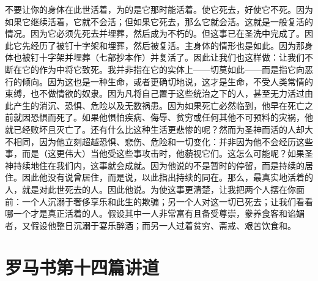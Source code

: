 不要让你的身体在此世活着，为的是它那时能活着。使它死去，好使它不死。因为如果它继续活着，它就不会活；但如果它死去，那么它就会活。这就是一般复活的情况。因为它必须先死去并埋葬，然后成为不朽的。但这事已在圣洗中完成了。因此它先经历了被钉十字架和埋葬，然后被复活。主身体的情形也是如此。因为那身体也被钉十字架并埋葬（七部抄本作）并复活了。因此让我们也这样做：让我们不断在它的作为中将它致死。我并非指在它的实体上——切莫如此——而是指它向恶行的倾向。因为这也是一种生命，或者更确切地说，这才是生命，不受人类常情的束缚，也不做情欲的奴隶。因为凡将自己置于这些统治之下的人，甚至无力活过由此产生的消沉、恐惧、危险以及无数祸患。因为如果死亡必然临到，他早在死亡之前就因恐惧而死了。如果他惧怕疾病、侮辱、贫穷或任何其他不可预料的灾祸，他就已经败坏且灭亡了。还有什么比这种生活更悲惨的呢？然而为圣神而活的人却大不相同，因为他立刻超越恐惧、悲伤、危险和一切变化：并非因为他不会经历这些事，而是（这更伟大）当他受这些事攻击时，他藐视它们。这怎么可能呢？如果圣神持续地住在我们内，这事就会成就。因为他说的不是暂时的停留，而是持续的居住。因此他没有说曾居住，而是说，以此指出持续的同在。那么，最真实地活着的人，就是对此世死去的人。因此他说。为使这事更清楚，让我把两个人摆在你面前：一个人沉溺于奢侈享乐和此生的欺骗；另一个人对这一切已死去；让我们看看哪一个才是真正活着的人。假设其中一人非常富有且备受尊崇，豢养食客和谄媚者，又假设他整日沉溺于宴乐醉酒；而另一人过着贫穷、斋戒、艰苦饮食和。\par



\section{罗马书第十四篇讲道}

\par

\par

